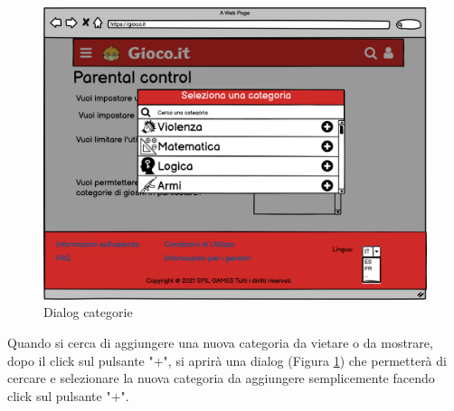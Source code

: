 \documentclass[../Report.tex]{subfiles}
\begin{document}
        \begin{figure}[H]
            \centering
            \includegraphics[width=\textwidth]{WParentalControlDialog.png}
            \caption{Dialog categorie}
            \label{fig: parental control dialog}
        \end{figure}

    Quando si cerca di aggiungere una nuova categoria da vietare o da mostrare, dopo il click sul pulsante "+", si aprirà una dialog (Figura \ref{fig: parental control dialog}) che permetterà di cercare e selezionare la nuova categoria da aggiungere semplicemente facendo click sul pulsante "+".\\
    
    \newpage

 
\end{document}
